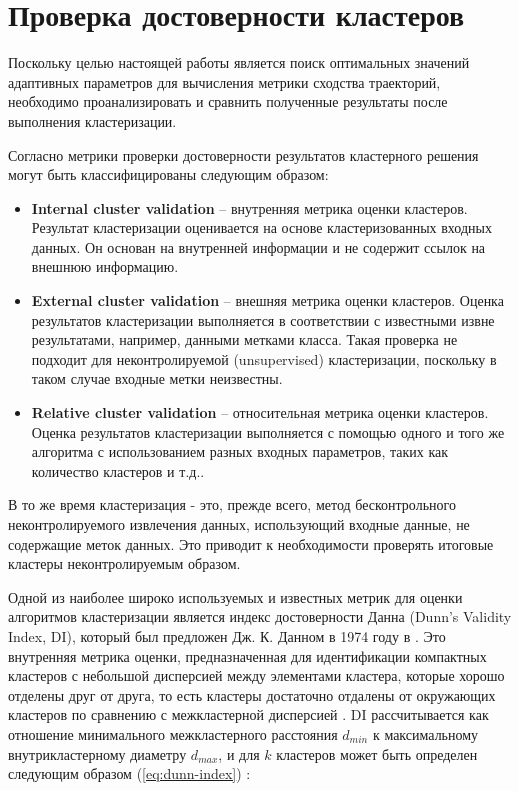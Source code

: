 \section{Проверка достоверности кластеров}

Поскольку целью настоящей работы является поиск оптимальных значений адаптивных параметров для вычисления метрики сходства траекторий, необходимо проанализировать и сравнить полученные результаты после выполнения кластеризации.

Согласно \cite{online:dunn_cl_valid} метрики проверки достоверности результатов кластерного решения могут быть классифицированы следующим образом:
\begin{itemize}
	\setlength\itemsep{-0.5em}
	\item \textbf{Internal cluster validation} -- внутренняя метрика оценки кластеров. Результат кластеризации оценивается на основе кластеризованных входных данных. Он основан на внутренней информации и не содержит ссылок на внешнюю информацию.
	\item \textbf{External cluster validation} -- внешняя метрика оценки кластеров. Оценка результатов кластеризации выполняется в соответствии с известными извне результатами, например, данными метками класса. Такая проверка не подходит для неконтролируемой (unsupervised) кластеризации, поскольку в таком случае входные метки неизвестны.
	\item \textbf{Relative cluster validation} -- относительная метрика оценки кластеров. Оценка результатов кластеризации выполняется с помощью одного и того же алгоритма с использованием разных входных параметров, таких как количество кластеров и т.д..
\end{itemize}

В то же время кластеризация - это, прежде всего, метод бесконтрольного неконтролируемого извлечения данных, использующий входные данные, не содержащие меток данных. Это приводит к необходимости проверять итоговые кластеры неконтролируемым образом.

Одной из наиболее широко используемых и известных метрик для оценки алгоритмов кластеризации является индекс достоверности Данна (Dunn's Validity Index, DI), который был предложен Дж. К. Данном в 1974 году в \cite{article:dunn_orig}. Это внутренняя метрика оценки, предназначенная для идентификации компактных кластеров с небольшой дисперсией между элементами кластера, которые хорошо отделены друг от друга, то есть кластеры достаточно отдалены от окружающих кластеров по сравнению с межкластерной дисперсией \cite{online:hier_clust_r}. DI рассчитывается как отношение минимального межкластерного расстояния $d_{min}$ к максимальному внутрикластерному диаметру $d_{max}$, и для $k$ кластеров может быть определен следующим образом (\ref{eq:dunn-index}) \cite{article:quant_eval_perf_clust}:

